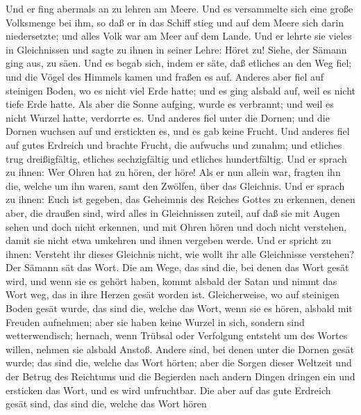  Und er fing abermals an zu lehren am Meere. Und es
versammelte sich eine große Volksmenge bei ihm, so daß er in das Schiff
stieg und auf dem Meere sich darin niedersetzte; und alles Volk war am
Meer auf dem Lande.  Und er lehrte sie vieles in
Gleichnissen und sagte zu ihnen in seiner Lehre:  Höret
zu! Siehe, der Sämann ging aus, zu säen.  Und es begab
sich, indem er säte, daß etliches an den Weg fiel; und die Vögel des
Himmels kamen und fraßen es auf.  Anderes aber fiel auf
steinigen Boden, wo es nicht viel Erde hatte; und es ging alsbald auf,
weil es nicht tiefe Erde hatte.  Als aber die Sonne
aufging, wurde es verbrannt; und weil es nicht Wurzel hatte, verdorrte
es.  Und anderes fiel unter die Dornen; und die Dornen
wuchsen auf und erstickten es, und es gab keine Frucht. 
Und anderes fiel auf gutes Erdreich und brachte Frucht, die aufwuchs und
zunahm; und etliches trug dreißigfältig, etliches sechzigfältig und
etliches hundertfältig.  Und er sprach zu ihnen: Wer Ohren
hat zu hören, der höre!  Als er nun allein war, fragten
ihn die, welche um ihn waren, samt den Zwölfen, über das Gleichnis.
 Und er sprach zu ihnen: Euch ist gegeben, das Geheimnis
des Reiches Gottes zu erkennen, denen aber, die draußen sind, wird alles
in Gleichnissen zuteil,  auf daß sie mit Augen sehen und
doch nicht erkennen, und mit Ohren hören und doch nicht verstehen, damit
sie nicht etwa umkehren und ihnen vergeben werde.  Und er
spricht zu ihnen: Versteht ihr dieses Gleichnis nicht, wie wollt ihr
alle Gleichnisse verstehen?  Der Sämann sät das Wort.
 Die am Wege, das sind die, bei denen das Wort gesät
wird, und wenn sie es gehört haben, kommt alsbald der Satan und nimmt
das Wort weg, das in ihre Herzen gesät worden ist. 
Gleicherweise, wo auf steinigen Boden gesät wurde, das sind die, welche
das Wort, wenn sie es hören, alsbald mit Freuden aufnehmen;
 aber sie haben keine Wurzel in sich, sondern sind
wetterwendisch; hernach, wenn Trübsal oder Verfolgung entsteht um des
Wortes willen, nehmen sie alsbald Anstoß.  Andere sind,
bei denen unter die Dornen gesät wurde; das sind die, welche das Wort
hörten;  aber die Sorgen dieser Weltzeit und der Betrug
des Reichtums und die Begierden nach andern Dingen dringen ein und
ersticken das Wort, und es wird unfruchtbar.  Die aber
auf das gute Erdreich gesät sind, das sind die, welche das Wort hören
